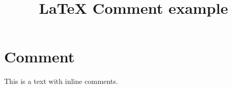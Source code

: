 \documentclass{article}
\begin{document}
\title{LaTeX Comment example}

\section {Comment}

This is a text %
with inline %
comments.
\end{document}
